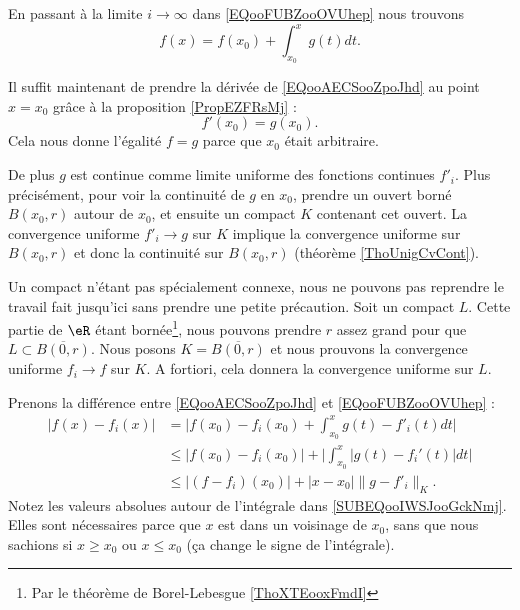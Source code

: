 \begin{normaltext}
\begin{subproof}

		En passant à la limite \( i\to \infty\) dans \eqref{EQooFUBZooOVUhep} nous trouvons
		\begin{equation}        \label{EQooAECSooZpoJhd}
			f(x)=f(x_0)+\int_{x_0}^xg(t)dt.
		\end{equation}

		Il suffit maintenant de prendre la dérivée de \eqref{EQooAECSooZpoJhd} au point \( x=x_0\) grâce à la proposition \ref{PropEZFRsMj} :
		\begin{equation}
			f'(x_0)=g(x_0).
		\end{equation}
		Cela nous donne l'égalité \( f=g\) parce que \( x_0\) était arbitraire.

		De plus \( g\) est continue comme limite uniforme des fonctions continues \( f'_i\). Plus précisément, pour voir la continuité de \( g\) en \( x_0\), prendre un ouvert borné \( B(x_0,r)\) autour de \( x_0\), et ensuite un compact \( K\) contenant cet ouvert. La convergence uniforme \( f'_i\to g\) sur \( K\) implique la convergence uniforme sur \( B(x_0,r)\) et donc la continuité sur \( B(x_0,r)\) (théorème \ref{ThoUnigCvCont}).


		Un compact n'étant pas spécialement connexe, nous ne pouvons pas reprendre le travail fait jusqu'ici sans prendre une petite précaution. Soit un compact \( L\). Cette partie de \( \eR\) étant bornée\footnote{Par le théorème de Borel-Lebesgue \ref{ThoXTEooxFmdI}}, nous pouvons prendre \( r\) assez grand pour que \( L\subset \overline{ B(0,r) }\). Nous posons \( K=\overline{ B(0,r) }\) et nous prouvons la convergence uniforme \( f_i\to f\) sur \( K\). A fortiori, cela donnera la convergence uniforme sur \( L\).

		Prenons la différence entre \eqref{EQooAECSooZpoJhd} et \eqref{EQooFUBZooOVUhep} :
		\begin{subequations}
			\begin{align}
				| f(x)-f_i(x) | & =\big| f(x_0)-f_i(x_0)+\int_{x_0}^x g(t)-f'_i(t)dt \big|                                               \\
				                & \leq | f(x_0)-f_i(x_0) |+\Big| \int_{x_0}^x| g(t)-f_i'(t) |dt  \Big|       \label{SUBEQooIWSJooGckNmj} \\
				                & \leq | (f-f_i)(x_0) |+| x-x_0 |\| g-f'_i \|_K.
			\end{align}
		\end{subequations}
		Notez les valeurs absolues autour de l'intégrale dans \eqref{SUBEQooIWSJooGckNmj}. Elles sont nécessaires parce que \( x\) est dans un voisinage de \( x_0\), sans que nous sachions si \( x\geq x_0\) ou \( x\leq x_0\) (ça change le signe de l'intégrale).


\end{subproof}
\end{normaltext}
